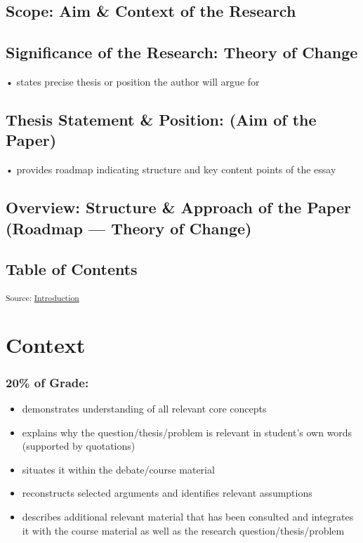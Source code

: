 \documentclass[12pt,a4paper]{report}      %
\begin{document}
\section{Scope: Aim \& Context of the
Research}\label{scope-aim-context-of-the-research}

\section{Significance of the Research: Theory of
Change}\label{significance-of-the-research-theory-of-change}

• states precise thesis or position the author will argue for

\section{Thesis Statement \& Position: (Aim of the
Paper)}\label{thesis-statement-position-aim-of-the-paper}

• provides roadmap indicating structure and key content points of the
essay

\section{Overview: Structure \& Approach of the Paper (Roadmap ---
Theory of
Change)}\label{overview-structure-approach-of-the-paper-roadmap-theory-of-change}

\section{Table of Contents}\label{table-of-contents}

\textsubscript{Source:
\href{https://VJMeyer.github.io/submission/chapters/Introduction.qmd.html\#1511baea-a705-44c1-94e9-c6ee72c34c3f}{Introduction}}

\chapter{Context}\label{context}

\subsection{20\% of Grade:}\label{of-grade}

\begin{itemize}
\item
  demonstrates understanding of all relevant core concepts
\item
  explains why the question/thesis/problem is relevant in student's own
  words (supported by quotations)
\item
  situates it within the debate/course material
\item
  reconstructs selected arguments and identifies relevant assumptions
\item
  describes additional relevant material that has been consulted and
  integrates it with the course material as well as the research
  question/thesis/problem
\end{itemize}
\end{document}
